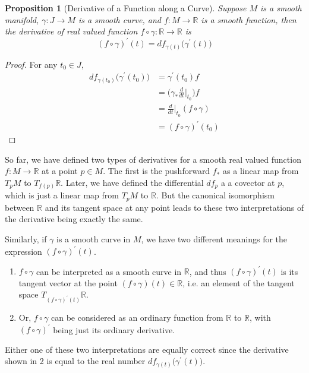 \documentclass{article}
\newtheorem{proposition}[theorem]{Proposition}
\theoremstyle{remark}
\theoremstyle{definition}
\begin{document}
\begin{proposition}[Derivative of a Function along a Curve]
Suppose $M$ is a smooth manifold, $\gamma: J \longrightarrow M$ is a smooth curve, and $f: M \longrightarrow \mathbb{R}$ is a smooth function, then the derivative of real valued function $f \circ \gamma: \mathbb{R} \longrightarrow \mathbb{R}$ is 
\[(f \circ \gamma)^\prime (t) = df_{\gamma(t)} \big( \gamma^\prime(t) \big)\]
\end{proposition}
\begin{proof}
For any $t_0 \in J$,
\begin{align*}
    df_{\gamma(t_0)} \big( \gamma^\prime (t_0)\big) & = \gamma^\prime (t_0) f \\
    & = \bigg( \gamma_* \frac{d}{dt} \bigg|_{t_0} \bigg) f \\
    & = \frac{d}{dt} \bigg|_{t_0} (f \circ \gamma) \\
    & = (f \circ \gamma)^\prime (t_0) 
\end{align*}
\end{proof}

So far, we have defined two types of derivatives for a smooth real valued function $f: M \longrightarrow \mathbb{R}$ at a point $p \in M$. The first is the pushforward $f_*$ as a linear map from $T_p M$ to $T_{f(p)} \mathbb{R}$. Later, we have defined the differential $df_p$ a a covector at $p$, which is just a linear map from $T_p M$ to $\mathbb{R}$. But the canonical isomorphism between $\mathbb{R}$ and its tangent space at any point leads to these two interpretations of the derivative being exactly the same. 

Similarly, if $\gamma$ is a smooth curve in $M$, we have two different meanings for the expression $(f \circ \gamma)^\prime (t)$. 
\begin{enumerate}
    \item $f \circ \gamma$ can be interpreted as a smooth curve in $\mathbb{R}$, and thus $(f \circ \gamma)^\prime (t)$ is its tangent vector at the point $(f \circ \gamma) (t) \in \mathbb{R}$, i.e. an element of the tangent space $T_{(f \circ \gamma)^\prime (t)} \mathbb{R}$. 
    \item Or, $f \circ \gamma$ can be considered as an ordinary function from $\mathbb{R}$ to $\mathbb{R}$, with $(f \circ \gamma)^\prime$ being just its ordinary derivative. 
\end{enumerate}
Either one of these two interpretations are equally correct since the derivative shown in 2 is equal to the real number $df_{\gamma(t)} \big( \gamma^\prime (t)\big)$. 
\end{document}
